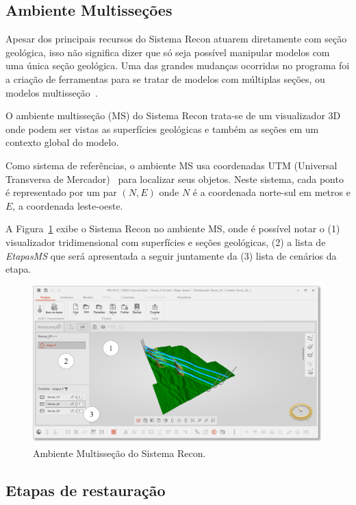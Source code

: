 \subsection{Ambiente Multisseções}

Apesar dos principais recursos do Sistema Recon atuarem diretamente com seção geológica, isso não significa dizer que só seja possível manipular modelos com uma única seção geológica. Uma das grandes mudanças ocorridas no programa foi a criação de ferramentas para se tratar de modelos com múltiplas seções, ou modelos multisseção~\cite{Felipe, Garcia}.

O ambiente multisseção (MS) do Sistema Recon trata-se de um visualizador 3D onde podem ser vistas as superfícies geológicas e também as seções em um contexto global do modelo.

Como sistema de referências, o ambiente MS usa coordenadas UTM (Universal Transversa de Mercador)~\cite{IBGE} para localizar seus objetos. Neste sistema, cada ponto é representado por um par $(N, E)$ onde $N$ é a coordenada norte-sul em metros e $E$, a coordenada leste-oeste.

A Figura~\ref{fig-recon-7} exibe o Sistema Recon no ambiente MS, onde é possível notar o (1) visualizador tridimensional com superfícies e seções geológicas, (2) a lista de \textit{EtapasMS} que será apresentada a seguir juntamente da (3) lista de cenários da etapa.

\begin{figure} [H]
  \begin{center}
    \includegraphics[width=\textwidth]{images/fig-recon-7}
    \caption{Ambiente Multisseção do Sistema Recon.}\label{fig-recon-7}
  \end{center}
\end{figure}

\subsection{Etapas de restauração}


